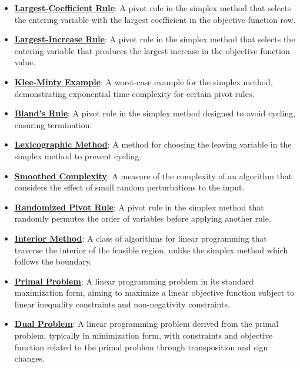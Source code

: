 \documentclass{article}%
\begin{document}
\begin{itemize}[leftmargin=*]
\item \href{https://www.math.purdue.edu/~yipn/421/2024-09-05-SimplexEfficiency.pdf#page=3}{\textbf{Largest{-}Coefficient Rule}}: A pivot rule in the simplex method that selects the entering variable with the largest coefficient in the objective function row. %
\item \href{https://www.math.purdue.edu/~yipn/421/2024-09-05-SimplexEfficiency.pdf#page=6}{\textbf{Largest{-}Increase Rule}}: A pivot rule in the simplex method that selects the entering variable that produces the largest increase in the objective function value. %
\item \href{https://www.math.purdue.edu/~yipn/421/2024-09-05-SimplexEfficiency.pdf#page=2}{\textbf{Klee{-}Minty Example}}: A worst-case example for the simplex method, demonstrating exponential time complexity for certain pivot rules. %
\item \href{https://www.math.purdue.edu/~yipn/421/2024-09-05-SimplexEfficiency.pdf#page=10}{\textbf{Bland's Rule}}: A pivot rule in the simplex method designed to avoid cycling, ensuring termination. %
\item \href{https://www.math.purdue.edu/~yipn/421/2024-09-05-SimplexEfficiency.pdf#page=10}{\textbf{Lexicographic Method}}: A method for choosing the leaving variable in the simplex method to prevent cycling. %
\item \href{https://www.math.purdue.edu/~yipn/421/2024-09-05-SimplexEfficiency.pdf#page=11}{\textbf{Smoothed Complexity}}: A measure of the complexity of an algorithm that considers the effect of small random perturbations to the input. %
\item \href{https://www.math.purdue.edu/~yipn/421/2024-09-05-SimplexEfficiency.pdf#page=10}{\textbf{Randomized Pivot Rule}}: A pivot rule in the simplex method that randomly permutes the order of variables before applying another rule. %
\item \href{https://www.math.purdue.edu/~yipn/421/2024-09-05-SimplexEfficiency.pdf#page=12}{\textbf{Interior Method}}: A class of algorithms for linear programming that traverse the interior of the feasible region, unlike the simplex method which follows the boundary. %
\item \href{https://www.math.purdue.edu/~yipn/421/2024-09-12-Duality.pdf#page=1}{\textbf{Primal Problem}}: A linear programming problem in its standard maximization form, aiming to maximize a linear objective function subject to linear inequality constraints and non-negativity constraints.%
\item \href{https://www.math.purdue.edu/~yipn/421/2024-09-12-Duality.pdf#page=1}{\textbf{Dual Problem}}: A linear programming problem derived from the primal problem, typically in minimization form, with constraints and objective function related to the primal problem through transposition and sign changes.%

\end{itemize}
\end{document}
